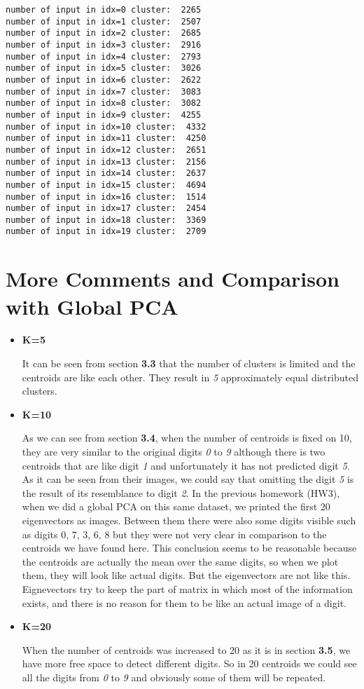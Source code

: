 \documentclass[11pt]{article}
\begin{document}
    \begin{Verbatim}[commandchars=\\\{\}]
number of input in idx=0 cluster:  2265
number of input in idx=1 cluster:  2507
number of input in idx=2 cluster:  2685
number of input in idx=3 cluster:  2916
number of input in idx=4 cluster:  2793
number of input in idx=5 cluster:  3026
number of input in idx=6 cluster:  2622
number of input in idx=7 cluster:  3083
number of input in idx=8 cluster:  3082
number of input in idx=9 cluster:  4255
number of input in idx=10 cluster:  4332
number of input in idx=11 cluster:  4250
number of input in idx=12 cluster:  2651
number of input in idx=13 cluster:  2156
number of input in idx=14 cluster:  2637
number of input in idx=15 cluster:  4694
number of input in idx=16 cluster:  1514
number of input in idx=17 cluster:  2454
number of input in idx=18 cluster:  3369
number of input in idx=19 cluster:  2709
    \end{Verbatim}
\pagebreak
    \hypertarget{more-comments-and-comparison-with-global-pca}{%
\section{More Comments and Comparison with Global
PCA}\label{more-comments-and-comparison-with-global-pca}}

    \begin{itemize}
\item
  \textbf{K=5}

  It can be seen from section \textbf{3.3} that the number of clusters
  is limited and the centroids are like each other. They result
  in \emph{5} approximately equal distributed clusters.
\item
  \textbf{K=10}

  As we can see from section \textbf{3.4}, when the number of centroids
  is fixed on 10, they are very similar to the original digits \emph{0}
  to \emph{9} although there is two centroids that are like digit
  \emph{1} and unfortunately it has not predicted digit \emph{5}. As it
  can be seen from their images, we could say that omitting the digit
  \emph{5} is the result of its resemblance to digit \emph{2}. In the previous homework (HW3), when we did a global PCA on this same dataset, we printed the first 20 eigenvectors as images. Between them there were also some digits visible such as digits 0, 7, 3, 6, 8 but they were not very clear in comparison to the centroids we have found here. This conclusion seems to be reasonable because the centroids are actually the mean over the same digits, so when we plot them, they will look like actual digits. But the eigenvectors are not like this. Eignevectors try to keep the part of matrix in which most of the information exists, and there is no reason for them to be like an actual image of a digit.  
\item
  \textbf{K=20}

  When the number of centroids was increased to 20 as it is in section
  \textbf{3.5}, we have more free space to detect different digits. So
  in 20 centroids we could see all the digits from \emph{0} to \emph{9}
  and obviously some of them will be repeated.
\end{itemize}


    
    
    
\end{document}
